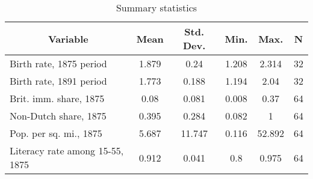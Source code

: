 
\begin{table}[htbp]\centering \caption{Summary statistics \label{sumstat}}
\begin{tabular}{l c c c c c}\hline\hline
\multicolumn{1}{c}{\textbf{Variable}} & \textbf{Mean}
 & \textbf{Std. Dev.}& \textbf{Min.} &  \textbf{Max.} & \textbf{N}\\ \hline
Birth rate, 1875 period & 1.879 & 0.24 & 1.208 & 2.314 & 32\\
Birth rate, 1891 period & 1.773 & 0.188 & 1.194 & 2.04 & 32\\
Brit. imm. share, 1875 & 0.08 & 0.081 & 0.008 & 0.37 & 64\\
Non-Dutch share, 1875 & 0.395 & 0.284 & 0.082 & 1 & 64\\
Pop. per sq. mi., 1875 & 5.687 & 11.747 & 0.116 & 52.892 & 64\\
Literacy rate among 15-55, 1875 & 0.912 & 0.041 & 0.8 & 0.975 & 64\\
\hline\end{tabular}
\end{table}
